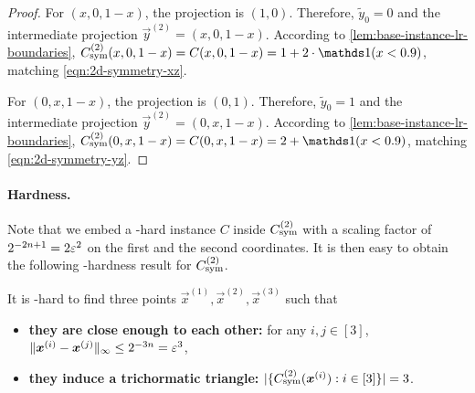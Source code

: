 \begin{proof}
    For $(x,0,1-x)$, the projection is $(1,0)$. Therefore, $\tilde{y}_0=0$ and the intermediate projection $\vec{y}^{(2)}=(x,0,1-x)$.
    According to \cref{lem:base-instance-lr-boundaries}, $\Csym{2}(x,0,1-x)=C(x,0,1-x)=1+2\cdot \ind(x<0.9)$, matching \cref{eqn:2d-symmetry-xz}.

    For $(0,x,1-x)$, the projection is $(0,1)$.
    Therefore, $\tilde{y}_0=1$ and the intermediate projection $\vec{y}^{(2)}=(0,x,1-x)$.
    According to \cref{lem:base-instance-lr-boundaries}, $\Csym{2}(0,x,1-x)=C(0,x,1-x)=2+ \ind(x<0.9)$, matching \cref{eqn:2d-symmetry-yz}.
\end{proof}

\paragraph{Hardness.} Note that we embed a \PPAD-hard 
instance $C$ inside $C_{\rm sym}^{(2)}$ with a scaling factor of $2^{-2n+1}=2\varepsilon^2$ on the first and the second  coordinates.
It is then easy to obtain the following \PPAD-hardness result for $C_{\rm sym}^{(2)}$.

\begin{lemma}
    It is \PPAD-hard to find three points $\vec{x}^{(1)}, \vec{x}^{(2)}, \vec{x}^{(3)}$ such that 
    \begin{itemize}[itemsep=0.2em,topsep=0.5em]
        \item {\bf they are close enough to each other:} for any $i,j\in [3]$, $\| {\boldsymbol{x}^{(i)}-\boldsymbol{x}^{(j)}} \|_{\infty}\leq 2^{-3n}=\varepsilon^3$, 
        \item {\bf they induce a trichormatic triangle:} $|\{{C_{\rm sym}^{(2)}(\boldsymbol{x}^{(i)}):i\in [3]} \}|=3$. 
    \end{itemize}
\end{lemma}


